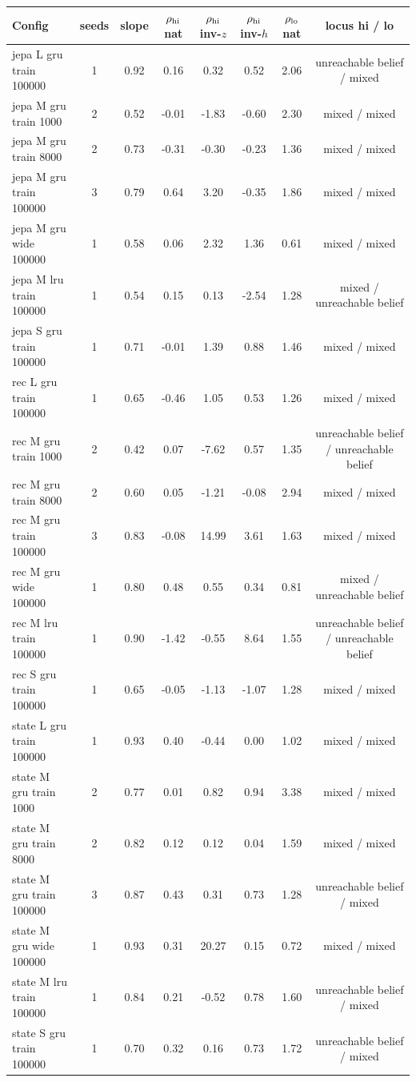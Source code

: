 \begin{tabular}{lccccccc}
\toprule
Config & seeds & slope & $\rho_{\rm hi}$ nat & $\rho_{\rm hi}$ inv-$z$ & $\rho_{\rm hi}$ inv-$h$ & $\rho_{\rm lo}$ nat & locus hi / lo\\
\midrule
jepa L gru train 100000 & 1 & 0.92 & 0.16 & 0.32 & 0.52 & 2.06 & unreachable belief / mixed\\
jepa M gru train 1000 & 2 & 0.52 & -0.01 & -1.83 & -0.60 & 2.30 & mixed / mixed\\
jepa M gru train 8000 & 2 & 0.73 & -0.31 & -0.30 & -0.23 & 1.36 & mixed / mixed\\
jepa M gru train 100000 & 3 & 0.79 & 0.64 & 3.20 & -0.35 & 1.86 & mixed / mixed\\
jepa M gru wide 100000 & 1 & 0.58 & 0.06 & 2.32 & 1.36 & 0.61 & mixed / mixed\\
jepa M lru train 100000 & 1 & 0.54 & 0.15 & 0.13 & -2.54 & 1.28 & mixed / unreachable belief\\
jepa S gru train 100000 & 1 & 0.71 & -0.01 & 1.39 & 0.88 & 1.46 & mixed / mixed\\
rec L gru train 100000 & 1 & 0.65 & -0.46 & 1.05 & 0.53 & 1.26 & mixed / mixed\\
rec M gru train 1000 & 2 & 0.42 & 0.07 & -7.62 & 0.57 & 1.35 & unreachable belief / unreachable belief\\
rec M gru train 8000 & 2 & 0.60 & 0.05 & -1.21 & -0.08 & 2.94 & mixed / mixed\\
rec M gru train 100000 & 3 & 0.83 & -0.08 & 14.99 & 3.61 & 1.63 & mixed / mixed\\
rec M gru wide 100000 & 1 & 0.80 & 0.48 & 0.55 & 0.34 & 0.81 & mixed / unreachable belief\\
rec M lru train 100000 & 1 & 0.90 & -1.42 & -0.55 & 8.64 & 1.55 & unreachable belief / unreachable belief\\
rec S gru train 100000 & 1 & 0.65 & -0.05 & -1.13 & -1.07 & 1.28 & mixed / mixed\\
state L gru train 100000 & 1 & 0.93 & 0.40 & -0.44 & 0.00 & 1.02 & mixed / mixed\\
state M gru train 1000 & 2 & 0.77 & 0.01 & 0.82 & 0.94 & 3.38 & mixed / mixed\\
state M gru train 8000 & 2 & 0.82 & 0.12 & 0.12 & 0.04 & 1.59 & mixed / mixed\\
state M gru train 100000 & 3 & 0.87 & 0.43 & 0.31 & 0.73 & 1.28 & unreachable belief / mixed\\
state M gru wide 100000 & 1 & 0.93 & 0.31 & 20.27 & 0.15 & 0.72 & mixed / mixed\\
state M lru train 100000 & 1 & 0.84 & 0.21 & -0.52 & 0.78 & 1.60 & unreachable belief / mixed\\
state S gru train 100000 & 1 & 0.70 & 0.32 & 0.16 & 0.73 & 1.72 & unreachable belief / mixed\\
\bottomrule
\end{tabular}
